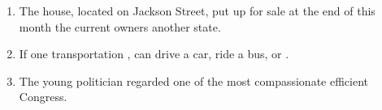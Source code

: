\begin{enumerate}
\item \begin{inparaenum}[A]
The house,  located on Jackson Street,  put up for sale at the end of this month  the current owners  another state. 
\end{inparaenum}

\item \begin{inparaenum}[A]
If one  transportation ,  can drive a car, ride a bus, or . 
\end{inparaenum}

\item \begin{inparaenum}[A]
The young politician  regarded  one of the most compassionate  efficient  Congress. 
\end{inparaenum}


\end{enumerate}